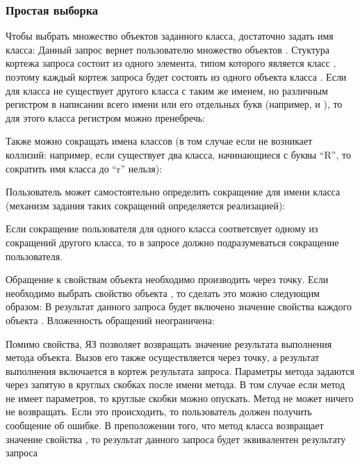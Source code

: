 \subsubsection{Простая выборка}\label{simple-select}
Чтобы выбрать множество объектов заданного класса, достаточно задать имя класса:
Данный запрос вернет пользователю множество объектов .
Стуктура кортежа запроса состоит из одного элемента, типом
которого является класс , поэтому каждый кортеж запроса
будет состоять из одного объекта класса .
Если для класса не существует другого класса с таким же именем, но различным регистром
в написании всего имени или его отдельных букв (например,  и ),
то для этого класса регистром можно пренебречь:

Также можно сокращать имена классов (в том случае если не возникает коллизий: 
например, если существует два класса, начинающиеся с буквы ``R'', то сократить
имя класса до ``r'' нельзя):

Пользователь может самостоятельно определить сокращение для имени класса (механизм
задания таких сокращений определяется реализацией):

Если сокращение пользователя для одного класса соответсвует одному из сокращений
другого класса, то в запросе должно подразумеваться сокращение пользователя.

Обращение к свойствам объекта необходимо производить через точку.  
Если необходимо выбрать свойство  объекта , 
то сделать это можно следующим образом:
В результат данного запроса будет включено значение свойства  каждого объекта .
Вложенность обращений неограничена:

Помимо свойства, ЯЗ позволяет возвращать значение результата выполнения метода объекта.
Вызов его также осуществляется через точку, а результат выполнения включается в кортеж
результата запроса. Параметры метода задаются через запятую в круглых скобках после
имени метода. В том случае если метод не имеет параметров, то круглые скобки можно опускать.
Метод не может ничего не возвращать. Если это происходить, то пользователь должен получить
сообщение об ошибке. В преположении того, что метод  класса  возвращает
значение свойства , то результат данного запроса
будет эквивалентен результату запроса


